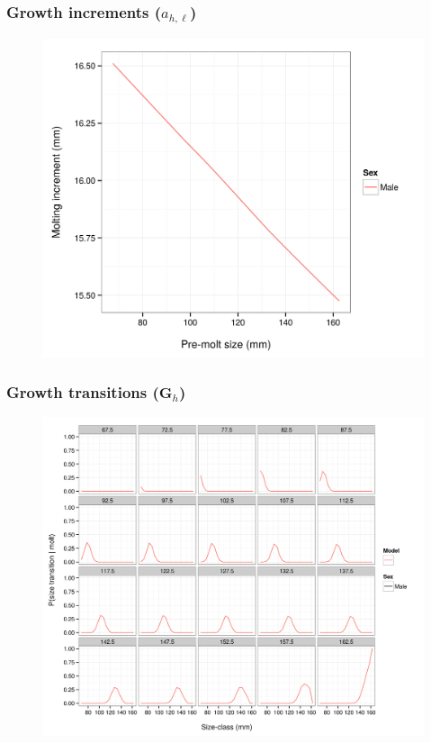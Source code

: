 \documentclass{beamer}
\begin{document}
\begin{frame}
\frametitle{Growth increments ($a_{h,\ell}$)}
\begin{figure}[!htbp]
  \centering
  \includegraphics[width=0.75\linewidth]{../../examples/bbrkc/OneSex/figure/gi.png}
\end{figure}
\end{frame}


\begin{frame}
\frametitle{Growth transitions ($\boldsymbol{G}_h$)}
\begin{figure}[!htbp]
  \centering
  \includegraphics[width=0.75\linewidth]{../../examples/bbrkc/OneSex/figure/growth_transition.png}
\end{figure}
\end{frame}

\end{document}
